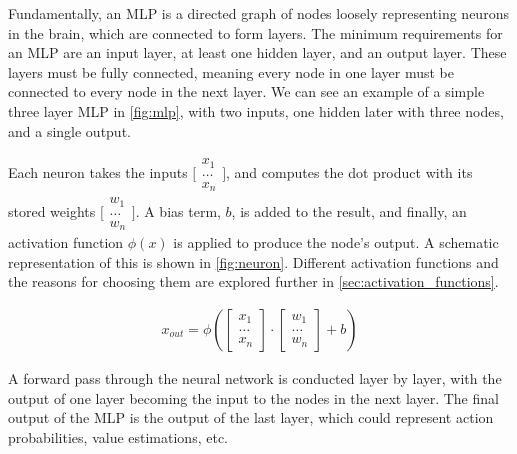 Fundamentally, an MLP is a directed graph of nodes loosely representing neurons
in the brain, which are connected to form layers. The minimum requirements for
an MLP are an input layer, at least one hidden layer, and an output layer.
These layers must be fully connected, meaning every node in one layer must be
connected to every node in the next layer. We can see an example of a simple
three layer MLP in \autoref{fig:mlp}, with two inputs, one hidden later with
three nodes, and a single output.



Each neuron takes the inputs $\bigl[ \begin{smallmatrix}
      x_1 \\
      \hdots \\
      x_n
    \end{smallmatrix}\bigr]$,
and computes the dot product with its stored weights
$\bigl[ \begin{smallmatrix}
      w_1 \\
      \hdots \\
      w_n
    \end{smallmatrix}\bigr]$. A bias term, $b$, is added to the result, and finally, an activation function $\phi(x)$ is applied to produce the node's output. A schematic representation of this is shown in \autoref{fig:neuron}. Different activation functions and the reasons for choosing them are explored further in \autoref{sec:activation_functions}.

\begin{gather*}
  x_{out} = \phi\left(
  \begin{bmatrix}
      x_1    \\
      \hdots \\
      x_n
    \end{bmatrix}
  \cdot
  \begin{bmatrix}
      w_1    \\
      \hdots \\
      w_n
    \end{bmatrix}
  + b\right)
\end{gather*}



A forward pass through the neural network is conducted layer by layer, with the
output of one layer becoming the input to the nodes in the next layer. The
final output of the MLP is the output of the last layer, which could represent
action probabilities, value estimations, etc.

